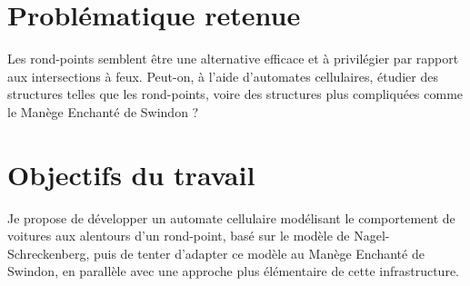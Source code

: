 \documentclass[11pt,a4paper,french]{article}
\begin{document}
\section*{Problématique retenue}

Les rond-points semblent être une alternative efficace et à privilégier par rapport aux intersections à feux.
Peut-on, à l'aide d'automates cellulaires, étudier des structures telles que les rond-points, voire des structures plus compliquées comme le Manège Enchanté de Swindon ?

\section*{Objectifs du travail}
Je propose de développer un automate cellulaire modélisant le comportement de voitures aux alentours d'un rond-point, basé sur le modèle de Nagel-Schreckenberg, puis de tenter d'adapter ce modèle au Manège Enchanté de Swindon, en parallèle avec une approche plus élémentaire de cette infrastructure.\par



\renewcommand{\refname}{Bibliographie}


\end{document}

